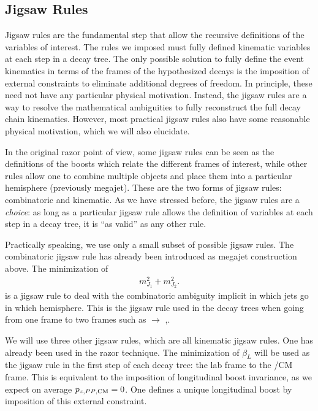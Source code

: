 \subsection{Jigsaw Rules}

Jigsaw rules are the fundamental step that allow the recursive definitions of the variables of interest.
The rules we imposed must fully defined kinematic variables at each step in a decay tree.
The only possible solution to fully define the event kinematics in terms of the frames of the hypothesized decays is the imposition of external constraints to eliminate additional degrees of freedom.
In principle, these need not have any particular physical motivation.
Instead, the jigsaw rules are a way to resolve the mathematical ambiguities to fully reconstruct the full decay chain kinematics.
However, most practical jigsaw rules also have some reasonable physical motivation, which we will also elucidate.

In the original razor point of view, some jigsaw rules can be seen as the definitions of the boosts which relate the different frames of interest, while other rules allow one to combine multiple objects and place them into a particular hemisphere (previously megajet).
These are the two forms of jigsaw rules: combinatoric and kinematic.
As we have stressed before, the jigsaw rules are a \textit{choice}: as long as a particular jigsaw rule allows the definition of variables at each step in a decay tree, it is ``as valid'' as any other rule.

Practically speaking, we use only a small subset of possible jigsaw rules.
The combinatoric jigsaw rule has already been introduced as megajet construction above.
The minimization of
\begin{align}
m_{J_1}^2 + m_{J_2}^2.
\end{align}
is a jigsaw rule to deal with the combinatoric ambiguity implicit in which jets go in which hemisphere.
This is the jigsaw rule used in the decay trees when going from one frame to two frames such as \PP $\rightarrow$ \Pa,\Pb.

We will use three other jigsaw rules, which are all kinematic jigsaw rules.
One has already been used in the razor technique.
The minimization of $\beta_L$ will be used as the jigsaw rule in the first step of each decay tree: the lab frame to the \PP/CM frame.
This is equivalent to the imposition of longitudinal boost invariance, as we expect on average $p_{z,\text{\ensuremath{PP },CM}} = 0$.
One defines a unique longitudinal boost by imposition of this external constraint.


